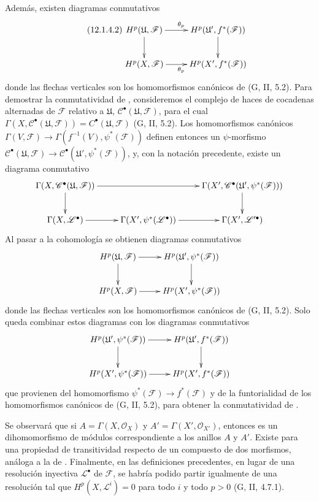 \begin{env}[12.1.4]
Además, existen diagramas conmutativos
\[
\label{0.12.1.4.2-fr}
\tag{12.1.4.2}
\xymatrix{
H^p(\mathfrak U,\mathcal F)\ar[r]^{\theta_p}\ar[d]
&H^p(\mathfrak U',f^*(\mathcal F))\ar[d]\\
H^p(X,\mathcal F)\ar[r]_{\theta_p}
&H^p(X',f^*(\mathcal F))
}
\]
donde las flechas verticales son los homomorfismos canónicos de
(G, II, 5.2).
Para demostrar la conmutatividad de , consideremos el
complejo de haces de cocadenas alternadas de $\mathcal F$ relativo a
$\mathfrak U$,
$\mathcal C^\bullet(\mathfrak U,\mathcal F)$, para el cual
$\Gamma(X,\mathcal C^\bullet(\mathfrak U,\mathcal F))=
C^\bullet(\mathfrak U,\mathcal F)$
(G, II, 5.2).
Los homomorfismos canónicos
$\Gamma(V,\mathcal F)\to
\Gamma(f^{-1}(V),\psi^*(\mathcal F))$
definen entonces un $\psi$-morfismo
$\mathcal C^\bullet(\mathfrak U,\mathcal F)\to
\mathcal C^\bullet(\mathfrak U',\psi^*(\mathcal F))$,
y, con la notación precedente, existe un diagrama conmutativo
\[
\xymatrix{
\Gamma(X,\mathcal C^\bullet(\mathfrak U,\mathcal F))\ar[rr]\ar[d]&
&\Gamma(X',\mathcal C^\bullet(\mathfrak U',\psi^*(\mathcal F)))\ar[d]\\
\Gamma(X,\mathcal L^\bullet)\ar[r]
&\Gamma(X',\psi^*(\mathcal L^\bullet))\ar[r]
&\Gamma(X',\mathcal L'^\bullet)
}
\]
Al pasar a la cohomología se obtienen diagramas conmutativos
\[
\xymatrix{
H^p(\mathfrak U,\mathcal F)\ar[r]\ar[d]
&H^p(\mathfrak U',\psi^*(\mathcal F))\ar[d]\\
H^p(X,\mathcal F)\ar[r]
&H^p(X',\psi^*(\mathcal F))
}
\]
donde las flechas verticales son los homomorfismos canónicos de
(G, II, 5.2).
Solo queda combinar estos diagramas con los diagramas conmutativos
\[
\xymatrix{
H^p(\mathfrak U',\psi^*(\mathcal F))\ar[r]\ar[d]
&H^p(\mathfrak U',f^*(\mathcal F))\ar[d]\\
H^p(X',\psi^*(\mathcal F))\ar[r]
&H^p(X',f^*(\mathcal F))
}
\]
que provienen del homomorfismo
$\psi^*(\mathcal F)\to f^*(\mathcal F)$ y de la funtorialidad de los
homomorfismos canónicos de (G, II, 5.2), para obtener la conmutatividad
de .

Se observará que si
$A=\Gamma(X,\mathcal O_X)$ y $A'=\Gamma(X',\mathcal O_{X'})$, entonces
 es un dihomomorfismo de módulos correspondiente a
los anillos $A$ y $A'$.
Existe para  una propiedad de transitividad respecto
de un compuesto de dos morfismos, análoga a la de
.
Finalmente, en las definiciones precedentes, en lugar de una resolución
inyectiva $\mathcal L^\bullet$ de $\mathcal F$, se habría podido partir igualmente de una resolución tal que $H^p(X,\mathcal L^i)=0$ para todo $i$ y todo $p>0$ (G, II, 4.7.1).
\end{env}

